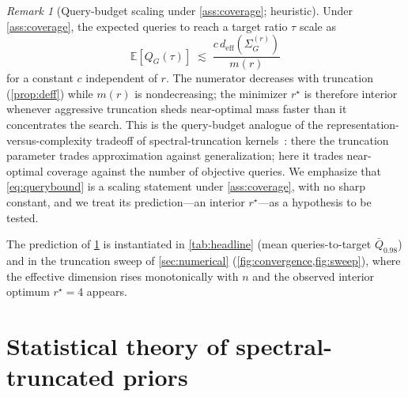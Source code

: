\documentclass[aps,prxquantum,reprint,amsmath,amssymb,floatfix,nofootinbib,superscriptaddress,longbibliography]{revtex4-2}
\theoremstyle{remark}
\newtheorem{remark}{Remark}
\begin{document}
\begin{remark}[Query-budget scaling under \cref{ass:coverage}; heuristic]
\label{rem:query}
Under \cref{ass:coverage}, the expected queries to reach a target ratio \(\tau\)
scale as
\begin{equation}
\mathbb{E}\!\left[Q_G(\tau)\right]\;\lesssim\;\frac{c\,d_{\mathrm{eff}}(\Sigma_G^{(r)})}{m(r)}
\label{eq:querybound}
\end{equation}
for a constant \(c\) independent of \(r\).  The numerator decreases with
truncation (\cref{prop:deff}) while \(m(r)\) is nondecreasing; the minimizer
\(r^{\star}\) is therefore interior whenever aggressive truncation sheds
near-optimal mass faster than it concentrates the search.  This is the
query-budget analogue of the representation-versus-complexity tradeoff of
spectral-truncation kernels~\cite{hashimoto2024spectral}: there the truncation
parameter trades approximation against generalization; here it trades near-optimal
coverage against the number of objective queries.  We emphasize that
\cref{eq:querybound} is a scaling statement under \cref{ass:coverage}, with no
sharp constant, and we treat its prediction---an interior \(r^{\star}\)---as a
hypothesis to be tested.
\end{remark}

The prediction of \cref{rem:query} is instantiated in \cref{tab:headline} (mean
queries-to-target \(\bar Q_{0.98}\)) and in the truncation sweep of
\cref{sec:numerical} (\cref{fig:convergence,fig:sweep}), where the effective
dimension rises monotonically with \(n\) and the observed interior optimum
\(r^{\star}{=}4\) appears.

\section{Statistical theory of spectral-truncated priors}
\label{sec:stattheory}
\end{document}
